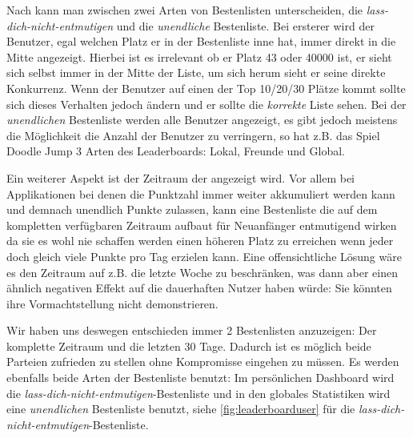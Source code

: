 \documentclass[12pt,twoside]{book}
\begin{document}
Nach \citep{zichermann2011gamification, 50 - 51} kann man zwischen zwei Arten von Bestenlisten unterscheiden, die \textit{lass-dich-nicht-entmutigen} und die \textit{unendliche} Bestenliste. Bei ersterer wird der Benutzer, egal welchen Platz er in der Bestenliste inne hat, immer direkt in die Mitte angezeigt. Hierbei ist es irrelevant ob er Platz 43 oder 40000 ist, er sieht sich selbst immer in der Mitte der Liste, um sich herum sieht er seine direkte Konkurrenz. Wenn der Benutzer auf einen der Top 10/20/30 Plätze kommt sollte sich dieses Verhalten jedoch ändern und er sollte die \textit{korrekte} Liste sehen.
Bei der \textit{unendlichen} Bestenliste werden alle Benutzer angezeigt, es gibt jedoch meistens die Möglichkeit die Anzahl der Benutzer zu verringern, so hat z.B. das Spiel Doodle Jump 3 Arten des Leaderboards: Lokal, Freunde und Global.

Ein weiterer Aspekt ist der Zeitraum der angezeigt wird. Vor allem bei Applikationen bei denen die Punktzahl immer weiter akkumuliert werden kann und demnach unendlich Punkte zulassen, kann eine Bestenliste die auf dem kompletten verfügbaren Zeitraum aufbaut für Neuanfänger entmutigend wirken da sie es wohl nie schaffen werden einen höheren Platz zu erreichen wenn jeder doch gleich viele Punkte pro Tag erzielen kann.
Eine offensichtliche Lösung wäre es den Zeitraum auf z.B. die letzte Woche zu beschränken, was dann aber einen ähnlich negativen Effekt auf die dauerhaften Nutzer haben würde: Sie könnten ihre Vormachtstellung nicht demonstrieren.

Wir haben uns deswegen entschieden immer 2 Bestenlisten anzuzeigen: Der komplette Zeitraum und die letzten 30 Tage. Dadurch ist es möglich beide Parteien zufrieden zu stellen ohne Kompromisse eingehen zu müssen. Es werden ebenfalls beide Arten der Bestenliste benutzt: Im persönlichen Dashboard wird die \textit{lass-dich-nicht-entmutigen}-Bestenliste und in den globales Statistiken wird eine \textit{unendlichen} Bestenliste benutzt, siehe \ref{fig:leaderboarduser} für die \textit{lass-dich-nicht-entmutigen}-Bestenliste.
\end{document}
